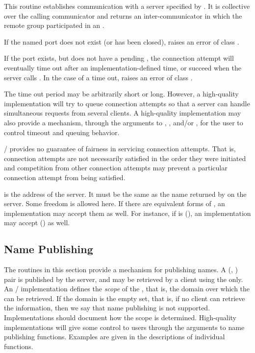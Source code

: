 This routine establishes communication with a server specified by
. It is collective
over the calling communicator and returns an inter-communicator
in which the remote group participated in an .

If the named port does not exist (or has been closed),
 raises an error of class
.

If the port exists, but does not have a pending
, the connection attempt will eventually
time out after an implementation-defined time, or succeed
when the server calls . In the
case of a time out,  raises
an error of class .

\begin{implementors}
The time out period may be arbitrarily short or long. However, a high-quality
implementation will try to queue connection attempts so that a
server can handle simultaneous requests from several clients.  A high-quality
implementation may also provide a mechanism, through the 
arguments to , , and/or
, for the user to
control timeout and queuing behavior.
\end{implementors}

\MPI/ provides no guarantee of fairness in servicing connection
attempts. That is, connection attempts are not necessarily satisfied
in the order they were initiated and competition from other
connection attempts may prevent a particular connection attempt
from being satisfied.



 is the address of the server.
It must be the same as the name returned
by  on the server. Some
freedom is allowed here. If there are equivalent forms
of , an implementation may accept them
as well. For instance, if  is (),
an implementation may accept () as well.


\subsection{Name Publishing}


The routines in this section provide a mechanism for
publishing names. A (, )
pair is published by the server, and may be retrieved
by a client using the  only.
An \MPI/ implementation defines the \emph{scope} of the ,
that is, the domain over which the 
can be retrieved. If the domain is the empty set, that is,
if no client can retrieve the information, then
we say that name publishing is not supported.
Implementations should document how the scope
is determined. High-quality implementations will
give some control to users through the 
arguments to name publishing functions.
Examples are given in the descriptions of individual functions.

